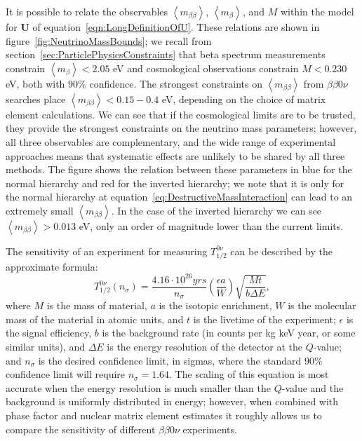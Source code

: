 It is possible to relate the observables $\left< m_{\beta\beta} \right>$, $\left< m_\beta \right>$, and $M$ within the model for $\mathbf{U}$ of equation~\ref{eqn:LongDefinitionOfU}.  These relations are shown in figure~\ref{fig:NeutrinoMassBounds}; we recall from section~\ref{sec:ParticlePhysicsConstraints} that beta spectrum measurements constrain $\left<m_\beta\right> < 2.05$ eV and cosmological observations constrain $M < 0.230$ eV, both with $90\%$ confidence.  The strongest constraints on $\left<m_{\beta\beta}\right>$ from $\beta\beta 0\nu$ searches place $\left<m_{\beta\beta}\right> < 0.15-0.4$ eV, depending on the choice of matrix element calculations.  We can see that if the cosmological limits are to be trusted, they provide the strongest constraints on the neutrino mass parameters; however, all three observables are complementary, and the wide range of experimental approaches means that systematic effects are unlikely to be shared by all three methods.  The figure shows the relation between these parameters in blue for the normal hierarchy and red for the inverted hierarchy; we note that it is only for the normal hierarchy at equation~\ref{eq:DestructiveMassInteraction} can lead to an extremely small $\left< m_{\beta\beta} \right>$.  In the case of the inverted hierarchy we can see $\left< m_{\beta\beta} \right> > 0.013$ eV, only an order of magnitude lower than the current limits.

The sensitivity of an experiment for measuring $T_{1/2}^{0\nu}$ can be described by the approximate formula:~\cite{RMPbb0n}
\begin{equation}\label{eqn:ApproxHalflifeSensitivity}
T_{1/2}^{0\nu}(n_\sigma) = \frac{4.16 \cdot 10^{26} yrs}{n_\sigma} \left( \frac{\epsilon a}{W}\right) \sqrt{\frac{Mt}{b \Delta E}},
\end{equation}
where $M$ is the mass of material, $a$ is the isotopic enrichment, $W$ is the molecular mass of the material in atomic units, and $t$ is the livetime of the experiment; $\epsilon$ is the signal efficiency, $b$ is the background rate (in counts per kg keV year, or some similar units), and $\Delta E$ is the energy resolution of the detector at the $Q$-value; and $n_\sigma$ is the desired confidence limit, in sigmas, where the standard $90\%$ confidence limit will require $n_\sigma = 1.64$.  The scaling of this equation is most accurate when the energy resolution is much smaller than the $Q$-value and the background is uniformly distributed in energy; however, when combined with phase factor and nuclear matrix element estimates it roughly allows us to compare the sensitivity of different $\beta\beta 0\nu$ experiments.

